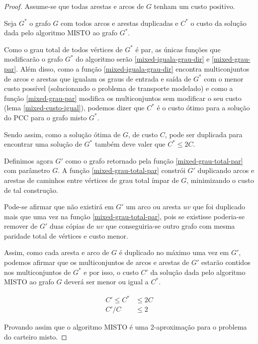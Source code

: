     \begin{proof}
        Assume-se que todas arestas e arcos de $G$ tenham um custo positivo. 

        Seja $G^*$ o grafo $G$ com todos arcos e arestas duplicadas e $C^*$ o custo da solução dada pelo algoritmo MISTO ao grafo $G^*$.

        Como o grau total de todos vértices de $G^*$ é par, as únicas funções que modificarão o grafo $G^*$ do algoritmo serão \ref{mixed-iguala-grau-dir} e \ref{mixed-grau-par}.
        Além disso, como a função \ref{mixed-iguala-grau-dir} encontra multiconjuntos de arcos e arestas que igualam os graus de entrada e saída de $G^*$ com o menor custo possível (solucionando o problema de transporte modelado) e como a função \ref{mixed-grau-par} modifica os multiconjuntos sem modificar o seu custo (lema \ref{mixed-custo-igual}), podemos dizer que $C^*$ é o custo ótimo para a solução do PCC para o grafo misto $G^*$. 

        Sendo assim, como a solução ótima de $G$, de custo $C$, pode ser duplicada para encontrar uma solução de $G^*$ também deve valer que $C^* \leq 2C$.

        Definimos agora $G'$ como o grafo retornado pela função \ref{mixed-grau-total-par} com parâmetro $G$.
        A função \ref{mixed-grau-total-par} constrói $G'$ duplicando arcos e arestas de caminhos entre vértices de grau total ímpar de $G$, minimizando o custo de tal construção.

        Pode-se afirmar que não existirá em $G'$ um arco ou aresta $uv$ que foi duplicado mais que uma vez na função \ref{mixed-grau-total-par}, pois se existisse poderia-se remover de $G'$ duas cópias de $uv$ que conseguiria-se outro grafo com mesma paridade total de vértices e custo menor.

        Assim, como cada aresta e arco de $G$ é duplicado no máximo uma vez em $G'$, podemos afirmar que os multiconjuntos de arcos e arestas de $G'$ estarão contidos nos multiconjuntos de $G^*$ e por isso, o custo $C'$ da solução dada pelo algoritmo MISTO ao grafo $G$ deverá ser menor ou igual a $C^*$.
        
        \begin{align*}
            C' \leq C^* &\leq 2C \\
            C'/C &\leq 2
        \end{align*}

        Provando assim que o algoritmo MISTO é uma 2-aproximação para o problema do carteiro misto.


    \end{proof}

